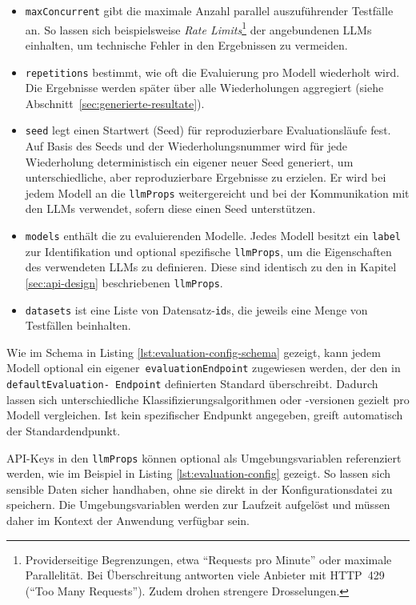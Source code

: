 \begin{itemize}
    \item \texttt{maxConcurrent} gibt die maximale Anzahl parallel auszuführender Testfälle an. So lassen sich beispielsweise \emph{Rate Limits}\footnote{Providerseitige Begrenzungen, etwa \enquote{Requests pro Minute} oder maximale Parallelität. Bei Überschreitung antworten viele Anbieter mit HTTP~429 (\enquote{Too Many Requests}). Zudem drohen strengere Drosselungen.} der angebundenen \acp{LLM} einhalten, um technische Fehler in den Ergebnissen zu vermeiden.
    \item \texttt{repetitions} bestimmt, wie oft die Evaluierung pro Modell wiederholt wird. Die Ergebnisse werden später über alle Wiederholungen aggregiert (siehe Abschnitt~\ref{sec:generierte-resultate}).
    \item \texttt{seed} legt einen Startwert (Seed) für reproduzierbare Evaluationsläufe fest. Auf Basis des Seeds und der Wiederholungsnummer wird für jede Wiederholung deterministisch ein eigener neuer Seed generiert, um unterschiedliche, aber reproduzierbare Ergebnisse zu erzielen. Er wird bei jedem Modell an die \texttt{llmProps} weitergereicht und bei der Kommunikation mit den \acp{LLM} verwendet, sofern diese einen Seed unterstützen.
    \item \texttt{models} enthält die zu evaluierenden Modelle. Jedes Modell besitzt ein \texttt{label} zur Identifikation und optional spezifische \texttt{llmProps}, um die Eigenschaften des verwendeten \acp{LLM} zu definieren. Diese sind identisch zu den in Kapitel \ref{sec:api-design} beschriebenen \texttt{llmProps}.
    \item \texttt{datasets} ist eine Liste von Datensatz-\texttt{id}s, die jeweils eine Menge von Testfällen beinhalten.
\end{itemize}

Wie im Schema in Listing \ref{lst:evaluation-config-schema} gezeigt, kann jedem Modell optional ein eigener\linebreak~\texttt{evaluationEndpoint} zugewiesen werden, der den in \texttt{defaultEvaluation-\linebreak~Endpoint} definierten Standard überschreibt. Dadurch lassen sich unterschiedliche Klassifizierungsalgorithmen oder -versionen gezielt pro Modell vergleichen. Ist kein spezifischer Endpunkt angegeben, greift automatisch der Standardendpunkt.

API-Keys in den \texttt{llmProps} können optional als Umgebungsvariablen referenziert werden, wie im Beispiel in Listing \ref{lst:evaluation-config} gezeigt. So lassen sich sensible Daten sicher handhaben, ohne sie direkt in der Konfigurationsdatei zu speichern. Die Umgebungsvariablen werden zur Laufzeit aufgelöst und müssen daher im Kontext der Anwendung verfügbar sein.